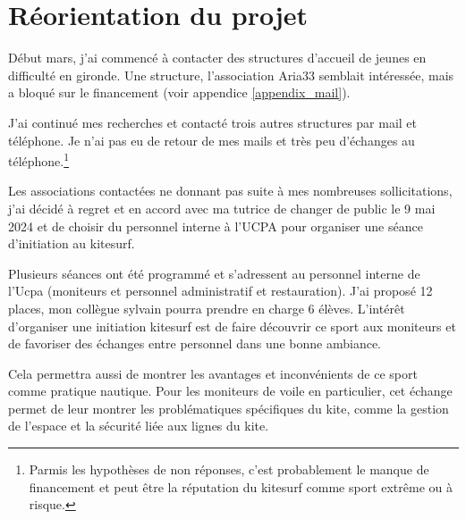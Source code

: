 \documentclass[11pt,a4paper]{report}
\begin{document}
\FloatBarrier
\section{Réorientation du projet\label{reorientation}}

Début mars, j'ai commencé à contacter des structures d'accueil de jeunes 
en difficulté en gironde. Une structure, l'association Aria33 semblait 
intéressée, mais a bloqué sur le financement (voir appendice \ref{appendix_mail}).

J'ai continué mes recherches et contacté trois autres structures par mail et
téléphone. Je n'ai pas eu de retour de mes mails et très peu d'échanges 
au téléphone.\footnote{Parmis les hypothèses de non réponses, c'est probablement 
le manque de financement et peut \^etre la réputation du kitesurf comme sport extr\^eme 
ou à risque.}


Les associations contactées ne donnant pas  suite
à mes nombreuses sollicitations, j'ai décidé à regret et en accord avec ma tutrice
de changer de public le 9 mai 2024 et de choisir du personnel interne à l'UCPA pour organiser une séance d'initiation au kitesurf. 

Plusieurs séances ont été programmé et s'adressent au personnel 
interne de l'Ucpa (moniteurs et personnel administratif et restauration).
J'ai  proposé 12 places, mon collègue sylvain pourra prendre en charge 6 élèves.
L'intér\^et d'organiser une initiation kitesurf est de faire découvrir ce
sport aux moniteurs et de favoriser des échanges entre personnel dans 
une bonne ambiance.

Cela permettra aussi de montrer les avantages
et inconvénients de ce sport comme pratique nautique. 
Pour les moniteurs de voile en particulier, cet échange permet
de leur montrer les problématiques spécifiques du kite, 
comme la gestion de l'espace et la sécurité liée aux lignes du kite.
\end{document}
